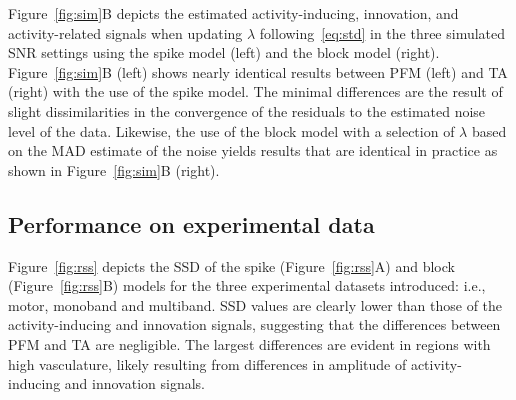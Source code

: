 
 Figure~\ref{fig:sim}B depicts the estimated activity-inducing, innovation, and activity-related signals when updating \(\lambda\) following~\eqref{eq:std} in the three simulated SNR settings using the spike model (left) and the block model (right). Figure~\ref{fig:sim}B (left) shows nearly identical results between PFM (left) and TA (right) with the use of the spike model. The minimal differences are the result of slight dissimilarities in the convergence of the residuals to the estimated noise level of the data. Likewise, the use of the block model with a selection of \(\lambda\) based on the MAD estimate of the noise yields results that are identical in practice as shown in Figure~\ref{fig:sim}B (right).

\subsection{Performance on experimental data}

Figure~\ref{fig:rss} depicts the SSD of the spike (Figure~\ref{fig:rss}A) and block (Figure~\ref{fig:rss}B) models for the three experimental datasets introduced: i.e., motor, monoband and multiband. SSD values are clearly lower than those of the activity-inducing and innovation signals, suggesting that the differences between PFM and TA are negligible. The largest differences are evident in regions with high vasculature, likely resulting from differences in amplitude of activity-inducing and innovation signals. 

